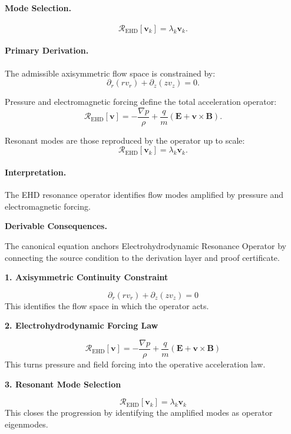 \paragraph{Mode Selection.}
\begin{equation}
\mathcal{R}_{\mathrm{EHD}}[\mathbf{v}_k]
=
\lambda_k\mathbf{v}_k.
\end{equation}

\paragraph{Primary Derivation.}
The admissible axisymmetric flow space is constrained by:
\begin{equation}
\partial_r(rv_r)+\partial_z(zv_z)=0.
\end{equation}

Pressure and electromagnetic forcing define the total acceleration operator:
\begin{equation}
\mathcal{R}_{\mathrm{EHD}}[\mathbf{v}]
=
-\frac{\nabla p}{\rho}
+
\frac{q}{m}
(\mathbf{E}+\mathbf{v}\times\mathbf{B}).
\end{equation}

Resonant modes are those reproduced by the operator up to scale:
\begin{equation}
\boxed{
\mathcal{R}_{\mathrm{EHD}}[\mathbf{v}_k]
=
\lambda_k\mathbf{v}_k.
}
\end{equation}

\paragraph{Interpretation.}
The EHD resonance operator identifies flow modes amplified by pressure and electromagnetic forcing.

\par\vspace{0.35em}
\noindent\textbf{Derivable Consequences.}\quad
\begingroup
\footnotesize
\raggedright
The canonical equation anchors Electrohydrodynamic Resonance Operator by connecting the source condition to the derivation layer and proof certificate.
\par\endgroup

\noindent\textbf{1. Axisymmetric Continuity Constraint}\par
\[
\partial_r(r v_r) + \partial_z(z v_z) = 0
\]
\noindent This identifies the flow space in which the operator acts.\par
\noindent\textbf{2. Electrohydrodynamic Forcing Law}\par
\[
\mathcal{R}_{\mathrm{EHD}}[\mathbf{v}]
=
-\frac{\nabla p}{\rho} + \frac{q}{m}(\mathbf{E}+\mathbf{v}\times\mathbf{B})
\]
\noindent This turns pressure and field forcing into the operative acceleration law.\par
\noindent\textbf{3. Resonant Mode Selection}\par
\[
\mathcal{R}_{\mathrm{EHD}}[\mathbf{v}_k] = \lambda_k \mathbf{v}_k
\]
\noindent This closes the progression by identifying the amplified modes as operator eigenmodes.\par

